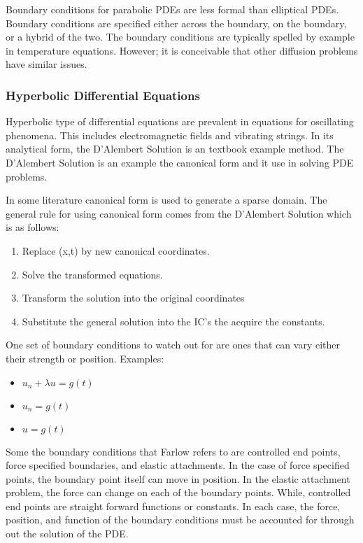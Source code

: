 Boundary conditions for parabolic PDEs are less formal than elliptical PDEs.  Boundary conditions are specified either across the boundary, on the boundary, or a hybrid of the two.    The boundary conditions are typically spelled by example in temperature equations.  However; it is conceivable that other diffusion problems have similar issues.  

\subsubsection {Hyperbolic Differential Equations}
Hyperbolic type of differential equations are prevalent in equations for oscillating phenomena.  This includes electromagnetic fields and vibrating strings.   In its analytical form, the D'Alembert Solution is an textbook example method.  The D'Alembert Solution is an example the canonical form and it use in solving PDE problems.  

In some literature canonical form is used to generate a sparse domain.  The general rule for using canonical form comes from the D'Alembert Solution which is as follows:
\begin{enumerate}
\item Replace (x,t) by new canonical coordinates.
\item Solve the transformed equations.
\item Transform the solution into the original coordinates
\item Substitute the general solution into the IC's the acquire the constants. 
\end{enumerate}


One set of boundary conditions to watch out for are ones that can vary either their strength or position.  Examples:
\begin{itemize}
\item $u_n + \lambda u = g(t)$
\item $u_n =g(t) $
\item $u = g(t) $
\end{itemize}

Some the boundary conditions that Farlow \cite{PDEfSE} refers to are controlled end points, force specified boundaries, and elastic attachments.  In the case of force specified points, the boundary point itself can move in position.  In the elastic attachment problem, the force can change on each of the boundary points.  While, controlled end points are straight forward functions or constants.   In each case, the force, position, and function of the boundary conditions must be accounted for through out the solution of the PDE.  


